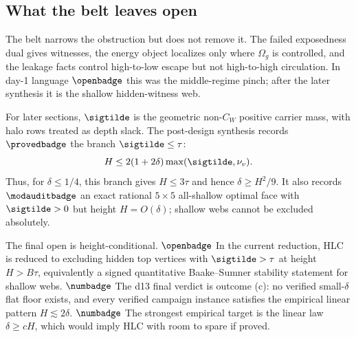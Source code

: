 \noindent{}

\subsection{What the belt leaves open}

The belt narrows the obstruction but does not remove it.  The failed
exposedness dual gives witnesses, the energy object localizes only where
\(\Omega_g\) is controlled, and the leakage facts control high-to-low
escape but not high-to-high circulation.  In day-1 language
\(\openbadge\) this was the middle-regime pinch; after the later synthesis
it is the shallow hidden-witness web.

For later sections, \(\sigtilde\) is the geometric non-\(C_W\) positive
carrier mass, with halo rows treated as depth slack.  The post-design
synthesis records \(\provedbadge\) the branch \(\sigtilde\le\tau\):
\[
        H\le 2(1+2\delta)\max(\sigtilde,\nu_v).
\]
Thus, for \(\delta\le 1/4\), this branch gives \(H\le 3\tau\) and hence
\(\delta\ge H^2/9\).  It also records \(\modauditbadge\) an exact
rational \(5\times5\) all-shallow optimal face with \(\sigtilde>0\) but
height \(H=O(\delta)\); shallow webs cannot be excluded absolutely.

The final open is height-conditional.  \(\openbadge\) In the current
reduction, HLC is reduced to excluding hidden top vertices with
\(\sigtilde>\tau\) at height \(H>B\tau\), equivalently a signed
quantitative Baake--Sumner stability statement for shallow webs.
\(\numbadge\) The d13 final verdict is outcome (c): no verified
small-\(\delta\) flat floor exists, and every verified campaign instance
satisfies the empirical linear pattern \(H\lesssim 2\delta\).
\(\numbadge\) The strongest empirical target is the linear law
\(\delta\ge cH\), which would imply HLC with room to spare if proved.
